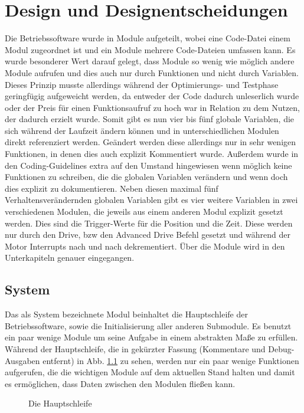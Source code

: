 \chapter{Design und Designentscheidungen}
Die Betriebssoftware wurde in Module aufgeteilt, wobei eine Code-Datei einem
Modul zugeordnet ist und ein Module mehrere Code-Dateien umfassen kann.
Es wurde besonderer Wert darauf gelegt, dass Module so wenig wie möglich andere
Module aufrufen und dies auch nur durch Funktionen und nicht durch Variablen.
Dieses Prinzip musste allerdings während der Optimierungs- und Testphase
geringfügig aufgeweicht werden, da entweder der Code dadurch unleserlich wurde
oder der Preis für einen Funktionsaufruf zu hoch war in Relation zu dem
Nutzen, der dadurch erzielt wurde.
Somit gibt es nun vier bis fünf globale Variablen, die sich während der Laufzeit
ändern können und in unterschiedlichen Modulen direkt referenziert werden.
Geändert werden diese allerdings nur in sehr wenigen Funktionen, in denen dies
auch explizit Kommentiert wurde. Außerdem wurde in den Coding-Guidelines extra
auf den Umstand hingewiesen wenn möglich keine Funktionen zu schreiben, die die
globalen Variablen verändern und wenn doch dies explizit zu dokumentieren.
Neben diesen maximal fünf Verhaltensverändernden globalen Variablen gibt es vier
weitere Variablen in zwei verschiedenen Modulen, die jeweils aus einem anderen
Modul explizit gesetzt werden. Dies sind die Trigger-Werte für die Position und
die Zeit. Diese werden nur durch den Drive, bzw den Advanced Drive Befehl
gesetzt und während der Motor Interrupts nach und nach dekrementiert.
Über die Module wird in den Unterkapiteln genauer eingegangen.
\section{System}
Das als System bezeichnete Modul beinhaltet die Hauptschleife der Betriebssoftware,
sowie die Initialisierung aller anderen Submodule. Es benutzt ein paar wenige Module
um seine Aufgabe in einem abstrakten Maße zu erfüllen. Während der Hauptschleife, die
in gekürzter Fassung (Kommentare und Debug-Ausgaben entfernt) in Abb. \ref{main_loop} zu sehen,
werden nur ein paar wenige Funktionen aufgerufen, die die wichtigen Module auf dem
aktuellen Stand halten und damit es ermöglichen, dass Daten zwischen den Modulen
fließen kann.
\begin{figure}[htb]
 \centering
 \caption{\label{main_loop}Die Hauptschleife}
\end{figure}
